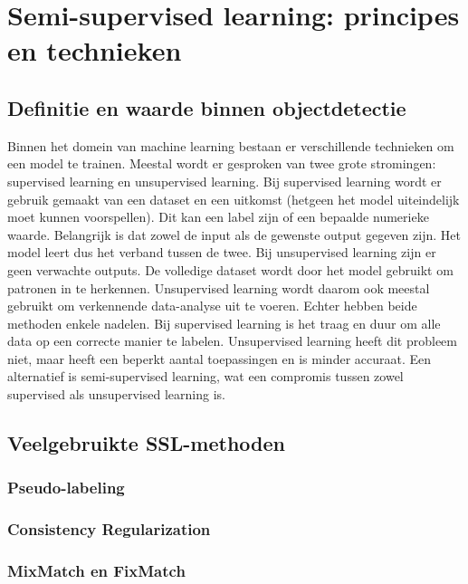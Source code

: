 \section{Semi-supervised learning: principes en technieken}

\subsection{Definitie en waarde binnen objectdetectie}

Binnen het domein van machine learning bestaan er verschillende technieken om een model te trainen. Meestal wordt er gesproken van twee grote stromingen: supervised learning en unsupervised learning. Bij supervised learning wordt er gebruik gemaakt van een dataset en een uitkomst (hetgeen het model uiteindelijk moet kunnen voorspellen). Dit kan een label zijn of een bepaalde numerieke waarde. Belangrijk is dat zowel de input als de gewenste output gegeven zijn. Het model leert dus het verband tussen de twee. Bij unsupervised learning zijn er geen verwachte outputs. De volledige dataset wordt door het model gebruikt om patronen in te herkennen. Unsupervised learning wordt daarom ook meestal gebruikt om verkennende data-analyse uit te voeren. Echter hebben beide methoden enkele nadelen. Bij supervised learning is het traag en duur om alle data op een correcte manier te labelen. Unsupervised learning heeft dit probleem niet, maar heeft een beperkt aantal toepassingen en is minder accuraat. Een alternatief is semi-supervised learning, wat een compromis tussen zowel supervised als unsupervised learning is. \autocite{C_A_Padmanabha_Reddy_2018} \\

\subsection{Veelgebruikte SSL-methoden}

\lipsum[1]

\subsubsection{Pseudo-labeling}

\lipsum[1]

\subsubsection{Consistency Regularization}

\lipsum[1]

\subsubsection{MixMatch en FixMatch}

\lipsum[1]